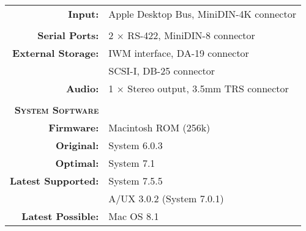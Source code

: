 \begin{tabular}{ r p{6in} }
\\
\textbf{Input:} & Apple Desktop Bus, MiniDIN-4K connector \\
\\
\textbf{Serial Ports:} & 2 \(\times\) RS-422, MiniDIN-8 connector \\
\textbf{External Storage:} & IWM interface, DA-19 connector \\
~ & SCSI-I, DB-25 connector \\
\textbf{Audio:} & 1 \(\times\) Stereo output, 3.5mm TRS connector \\
\\
\textbf{\textsc{System Software}} & ~ \\
\textbf{Firmware:} & Macintosh ROM (256k) \\
\textbf{Original:} & System 6.0.3 \\
\textbf{Optimal:} & System 7.1 \\
\textbf{Latest Supported:} & System 7.5.5 \\
~ & A/UX 3.0.2 (System 7.0.1) \\
\textbf{Latest Possible:} & Mac OS 8.1 \\
\end{tabular}